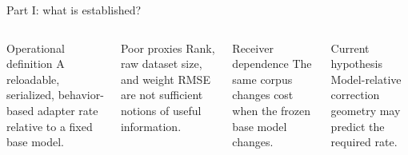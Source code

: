 \documentclass[aspectratio=169,10pt]{beamer}
\begin{document}
\begin{frame}{Part I: what is established?}
\begin{columns}[T,onlytextwidth]
\begin{block}{Operational definition}
\small A reloadable, serialized, behavior-based adapter rate relative to a fixed base model.
\end{block}
\begin{block}{Poor proxies}
\small Rank, raw dataset size, and weight RMSE are not sufficient notions of useful information.
\end{block}
\begin{block}{Receiver dependence}
\small The same corpus changes cost when the frozen base model changes.
\end{block}
\begin{block}{Current hypothesis}
\small Model-relative correction geometry may predict the required rate.
\end{block}
\end{columns}
\vfill
{}
\end{frame}
\end{document}
